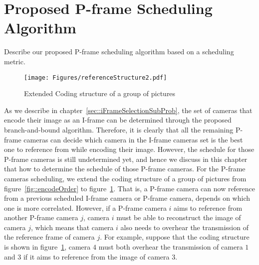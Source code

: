 \section{Proposed P-frame Scheduling Algorithm}
\label{sec::PFrameScheduling}
{\color{red}Describe our proposed P-frame scheduling algorithm based on a scheduling metric.}
%
\begin{figure}
\begin{center}
\texttt{[image: Figures/referenceStructure2.pdf]}
\caption{\label{fig::encodeOrder2}Extended Coding structure of a group of pictures}
\end{center}
\end{figure}
%
As we describe in chapter~\ref{sec::iFrameSelectionSubProb}, the set of cameras that encode their image as an I-frame can be determined through the proposed branch-and-bound algorithm.
Therefore, it is clearly that all the remaining P-frame cameras can decide which camera in the I-frame cameras set is the best one to reference from while encoding their image.
However, the schedule for those P-frame cameras is still undetermined yet, and hence we discuss in this chapter that how to determine the schedule of those P-frame cameras.
For the P-frame cameras scheduling, we extend the coding structure of a group of pictures from figure~\ref{fig::encodeOrder} to figure~\ref{fig::encodeOrder2}.
That is, a P-frame camera can now reference from a previous scheduled I-frame camera or P-frame camera, depends on which one is more correlated.
However, if a P-frame camera $i$ aims to reference from another P-frame camera $j$, camera $i$ must be able to reconstruct the image of camera $j$, which means that camera $i$ also needs to overhear the transmission of the reference frame of camera $j$.
For example, suppose that the coding structure is shown in figure~\ref{fig::encodeOrder2}, camera $4$ must both overhear the transmission of camera $1$ and $3$ if it aims to reference from the image of camera $3$.
%